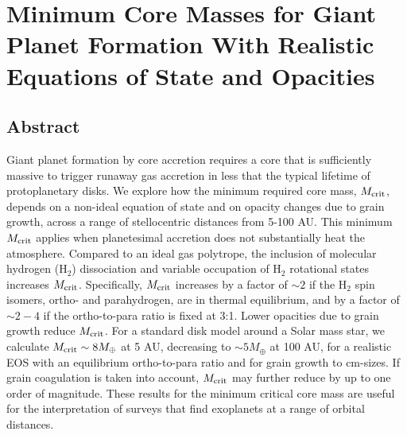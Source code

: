 
\chapter{Minimum Core Masses for Giant Planet Formation With Realistic Equations of State and Opacities}

\section*{Abstract}

Giant planet formation by core accretion requires a core that is sufficiently massive to trigger runaway gas accretion in less that the typical lifetime of protoplanetary disks. We explore how the minimum required core mass, $M_{\rm crit}$, depends on a non-ideal equation of state and on opacity changes due to grain growth, across a range of stellocentric distances from 5-100 AU. This minimum $M_{\rm crit}$ applies when planetesimal accretion does not substantially heat the atmosphere.  Compared to an ideal gas polytrope, the inclusion of molecular hydrogen (H$_2$) dissociation and variable occupation of H$_2$ rotational states increases $M_{\rm crit}$.  Specifically, $M_{\rm crit}$ increases by a factor of $\sim$$2$ if the H$_2$ spin isomers, ortho- and parahydrogen, are in thermal equilibrium, and by a factor of $\sim$$2-4$ if the ortho-to-para ratio is fixed at 3:1.  Lower opacities due to grain growth reduce $M_{\rm crit}$. For a standard disk model around a Solar mass star, we calculate $M_{\rm crit} \sim 8 M_{\oplus}$ at 5 AU, decreasing to $\sim$$5 M_{\oplus}$ at 100 AU, for a realistic EOS with an equilibrium ortho-to-para ratio and for grain growth to cm-sizes. If grain coagulation is taken into account, $M_{\rm crit}$ may further reduce by up to one order of magnitude. These results for the minimum critical core mass are useful for the interpretation of surveys that find exoplanets at a range of orbital distances.

